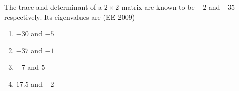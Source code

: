 \item The trace and determinant of a $2 \times 2$ matrix are known to be $-2$ and $-35$ respectively. Its eigenvalues are
\hfill(EE 2009)
\begin{multicols}{4}
\begin{enumerate}
     \item  $-30$ and $-5$
     \item  $-37$ and $-1$
     \item $-7$ and $5$
     \item $17.5$ and $-2$
\end{enumerate}
\end{multicols}
